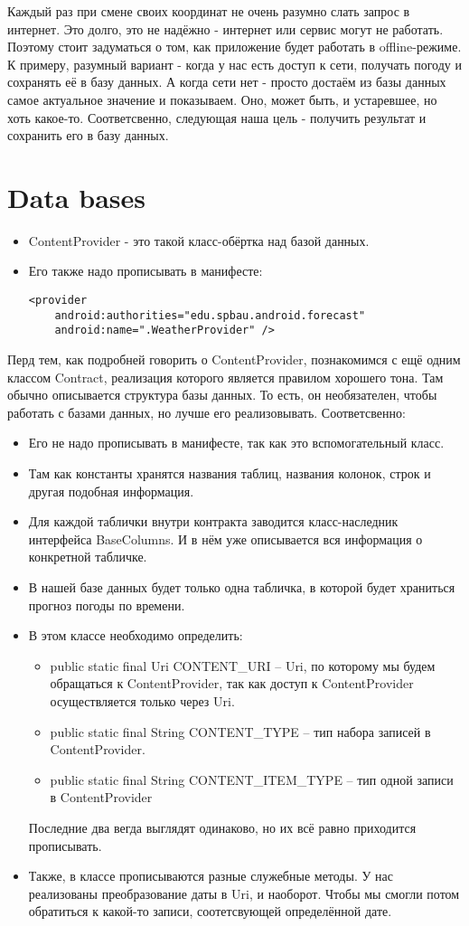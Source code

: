 \documentclass[12 pt]{article}
\begin{document}
    Каждый раз при смене своих координат не очень разумно слать запрос в интернет. Это долго, это не надёжно - интернет или сервис могут не работать. Поэтому стоит задуматься о том, как приложение будет работать в offline-режиме. К примеру, разумный вариант - когда у нас есть доступ к сети, получать погоду и сохранять её в базу данных. А когда сети нет - просто достаём из базы данных самое актуальное значение и показываем. Оно, может быть, и устаревшее, но хоть какое-то. Соответсвенно, следующая наша цель - получить результат и сохранить его в базу данных.
\section{Data bases}
	\begin{itemize}
		\item ContentProvider - это такой класс-обёртка над базой данных.
		\item Его также надо прописывать в манифесте:
		\begin{lstlisting}
<provider
	android:authorities="edu.spbau.android.forecast"
    android:name=".WeatherProvider" />		
		\end{lstlisting}
	\end{itemize}    
	Перд тем, как подробней говорить о ContentProvider, познакомимся с ещё одним классом Contract, реализация которого является правилом хорошего тона. Там обычно описывается структура базы данных. То есть, он необязателен, чтобы работать с базами данных, но лучше его реализовывать.
	Соответсвенно:
	\begin{itemize}
	    \item Его не надо прописывать в манифесте, так как это вспомогательный класс.
	    \item Там как константы хранятся названия таблиц, названия колонок, строк и другая подобная информация.
	    \item Для каждой таблички внутри контракта заводится класс-наследник интерфейса BaseColumns. И в нём уже описывается вся информация о конкретной табличке. 
	    \item В нашей базе данных будет только одна табличка, в которой будет храниться прогноз погоды по времени.
	    \item В этом классе необходимо определить: 
	    \begin{itemize}
	        \item public static final Uri CONTENT\_URI -- Uri, по которому мы будем обращаться к ContentProvider, так как доступ к ContentProvider осуществляется только через Uri. 
	        \item public static final String CONTENT\_TYPE -- тип набора записей в ContentProvider.
	        \item public static final String CONTENT\_ITEM\_TYPE -- тип одной записи в ContentProvider
	    \end{itemize}
	    Последние два вегда выглядят одинаково, но их всё равно приходится прописывать.
	    \item Также, в классе прописываются разные служебные методы. У нас реализованы преобразование даты в Uri, и наоборот. Чтобы мы смогли потом обратиться к какой-то записи, соотетсвующей определённой дате.
	\end{itemize}
	
\end{document}
